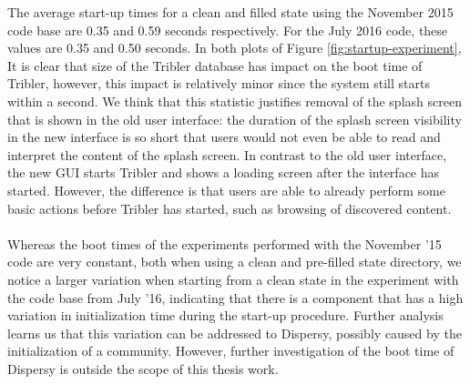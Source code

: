 The average start-up times for a clean and filled state using the November 2015 code base are 0.35 and 0.59 seconds respectively. For the July 2016 code, these values are 0.35 and 0.50 seconds. In both plots of Figure \ref{fig:startup-experiment}, It is clear that size of the Tribler database has impact on the boot time of Tribler, however, this impact is relatively minor since the system still starts within a second. We think that this statistic justifies removal of the splash screen that is shown in the old user interface: the duration of the splash screen visibility in the new interface is so short that users would not even be able to read and interpret the content of the splash screen. In contrast to the old user interface, the new GUI starts Tribler and shows a loading screen after the interface has started. However, the difference is that users are able to already perform some basic actions before Tribler has started, such as browsing of discovered content.\\\\
Whereas the boot times of the experiments performed with the November '15 code are very constant, both when using a clean and pre-filled state directory, we notice a larger variation when starting from a clean state in the experiment with the code base from July '16, indicating that there is a component that has a high variation in initialization time during the start-up procedure. Further analysis learns us that this variation can be addressed to Dispersy, possibly caused by the initialization of a community. However, further investigation of the boot time of Dispersy is outside the scope of this thesis work.

